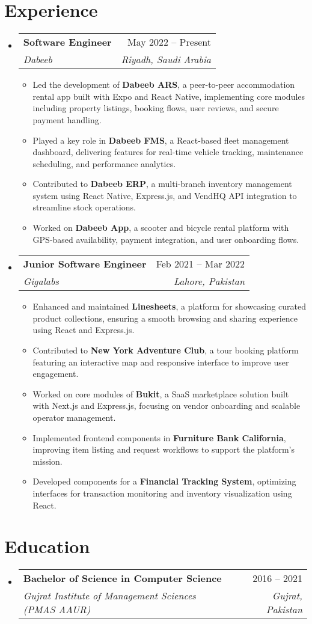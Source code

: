 \documentclass[letterpaper,11pt]{article}
\makeatletter
\newcommand{\resumeItem}[1]{\item\small{{#1 \vspace{-2pt}}}}
\newcommand{\resumeSubheading}[4]{
  \vspace{-2pt}\item
  \begin{tabular*}{0.97\textwidth}[t]{l@{\extracolsep{\fill}}r}
    \textbf{#1} & #2 \\
    \textit{\small#3} & \textit{\small #4} \\
  \end{tabular*}\vspace{-7pt}
}
\newcommand{\resumeSubHeadingListStart}{\begin{itemize}[leftmargin=0.15in, label={}]}
\newcommand{\resumeSubHeadingListEnd}{\end{itemize}}
\newcommand{\resumeItemListStart}{\begin{itemize}}
\newcommand{\resumeItemListEnd}{\end{itemize}\vspace{-5pt}}
\makeatother
\begin{document}
\section{Experience}
\resumeSubHeadingListStart

  \resumeSubheading
    {Software Engineer}{May 2022 -- Present}
    {Dabeeb}{Riyadh, Saudi Arabia}
    \resumeItemListStart
      \resumeItem{Led the development of \textbf{Dabeeb ARS}, a peer-to-peer accommodation rental app built with Expo and React Native, implementing core modules including property listings, booking flows, user reviews, and secure payment handling.}
      \resumeItem{Played a key role in \textbf{Dabeeb FMS}, a React-based fleet management dashboard, delivering features for real-time vehicle tracking, maintenance scheduling, and performance analytics.}
      \resumeItem{Contributed to \textbf{Dabeeb ERP}, a multi-branch inventory management system using React Native, Express.js, and VendHQ API integration to streamline stock operations.}
      \resumeItem{Worked on \textbf{Dabeeb App}, a scooter and bicycle rental platform with GPS-based availability, payment integration, and user onboarding flows.}
    \resumeItemListEnd

  \resumeSubheading
    {Junior Software Engineer}{Feb 2021 -- Mar 2022}
    {Gigalabs}{Lahore, Pakistan}
    \resumeItemListStart
      \resumeItem{Enhanced and maintained \textbf{Linesheets}, a platform for showcasing curated product collections, ensuring a smooth browsing and sharing experience using React and Express.js.}
      \resumeItem{Contributed to \textbf{New York Adventure Club}, a tour booking platform featuring an interactive map and responsive interface to improve user engagement.}
      \resumeItem{Worked on core modules of \textbf{Bukit}, a SaaS marketplace solution built with Next.js and Express.js, focusing on vendor onboarding and scalable operator management.}
      \resumeItem{Implemented frontend components in \textbf{Furniture Bank California}, improving item listing and request workflows to support the platform’s mission.}
      \resumeItem{Developed components for a \textbf{Financial Tracking System}, optimizing interfaces for transaction monitoring and inventory visualization using React.}
    \resumeItemListEnd

\resumeSubHeadingListEnd

\section{Education}
\resumeSubHeadingListStart
  \resumeSubheading
    {Bachelor of Science in Computer Science}{2016 -- 2021}
    {Gujrat Institute of Management Sciences (PMAS AAUR)}{Gujrat, Pakistan}
\resumeSubHeadingListEnd
\end{document}
